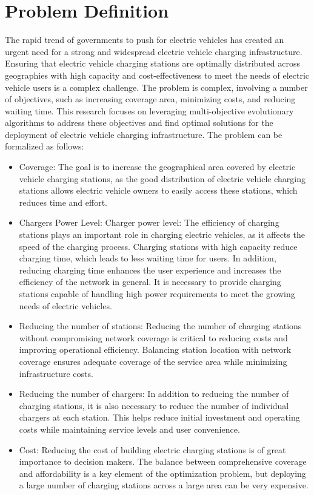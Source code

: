 \section{Problem Definition}
The rapid trend of governments to push for electric vehicles has created an urgent need for a strong and widespread electric vehicle charging infrastructure. Ensuring that electric vehicle charging stations are optimally distributed across geographies with high capacity and cost-effectiveness to meet the needs of electric vehicle users is a complex challenge. The problem is complex, involving a number of objectives, such as increasing coverage area, minimizing costs, and reducing waiting time. This research focuses on leveraging multi-objective evolutionary algorithms to address these objectives and find optimal solutions for the deployment of electric vehicle charging infrastructure. The problem can be formalized as follows:
\begin{itemize}
    \item Coverage: The goal is to increase the geographical area covered by electric vehicle charging stations, as the good distribution of electric vehicle charging stations allows electric vehicle owners to easily access these stations, which reduces time and effort.
    
    \item Chargers Power Level: Charger power level: The efficiency of charging stations plays an important role in charging electric vehicles, as it affects the speed of the charging process. Charging stations with high capacity reduce charging time, which leads to less waiting time for users. In addition, reducing charging time enhances the user experience and increases the efficiency of the network in general. It is necessary to provide charging stations capable of handling high power requirements to meet the growing needs of electric vehicles.
    
    \item Reducing the number of stations: Reducing the number of charging stations without compromising network coverage is critical to reducing costs and improving operational efficiency. Balancing station location with network coverage ensures adequate coverage of the service area while minimizing infrastructure costs.
    
    \item Reducing the number of chargers: In addition to reducing the number of charging stations, it is also necessary to reduce the number of individual chargers at each station. This helps reduce initial investment and operating costs while maintaining service levels and user convenience.

        
    \item Cost: Reducing the cost of building electric charging stations is of great importance to decision makers. The balance between comprehensive coverage and affordability is a key element of the optimization problem, but deploying a large number of charging stations across a large area can be very expensive.
\end{itemize}

